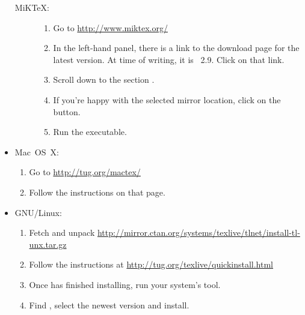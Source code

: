 \begin{itemize}
\begin{description}
   \item[MiKTeX:]\mbox{}

   \begin{enumerate}
    \item Go to \url{http://www.miktex.org/}

    \item In the left-hand panel, there is a link to the download page
     for the latest version. At time of writing, it is ~2.9.
     Click on that link.

    \item Scroll down to the section .

    \item If you're happy with the selected mirror location, click on the 
       button.

    \item Run the executable.
   \end{enumerate}
 \end{description}

\item Mac~OS~X:

 \begin{enumerate}
  \item Go to \url{http://tug.org/mactex/}

  \item Follow the instructions on that page.
 \end{enumerate}

\item GNU/Linux:

 \begin{enumerate}
  \item Fetch and unpack
    \url{http://mirror.ctan.org/systems/texlive/tlnet/install-tl-unx.tar.gz}

  \item Follow the instructions at
    \url{http://tug.org/texlive/quickinstall.html}

  \item Once  has finished installing, run your
   system's  tool.

  \item Find , select the newest version and install.
 \end{enumerate}

\end{itemize}

